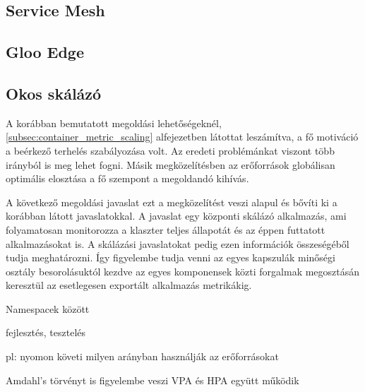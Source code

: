 \subsection{Service Mesh}

\subsection{Gloo Edge}

\subsection{Okos skálázó}

A korábban bemutatott megoldási lehetőségeknél, \ref{subsec:container_metric_scaling} alfejezetben látottat leszámítva, a fő motiváció a beérkező terhelés szabályozása volt.
Az eredeti problémánkat viszont több irányból is meg lehet fogni.
Másik megközelítésben az erőforrások globálisan optimális elosztása a fő szempont a megoldandó kihívás.

A következő megoldási javaslat ezt a megközelítést veszi alapul és bővíti ki a korábban látott javaslatokkal.
A javaslat egy központi skálázó alkalmazás, ami folyamatosan monitorozza a klaszter teljes állapotát és az éppen futtatott alkalmazásokat is.
A skálázási javaslatokat pedig ezen információk összeségéből tudja meghatározni.
Így figyelembe tudja venni az egyes kapszulák minőségi osztály besorolásuktól kezdve az egyes komponensek közti forgalmak megosztásán keresztül az esetlegesen exportált alkalmazás metrikákig.



Namespacek között

fejlesztés, tesztelés

pl: nyomon követi milyen arányban használják az erőforrásokat

Amdahl's törvényt is figyelembe  veszi
VPA és HPA együtt működik